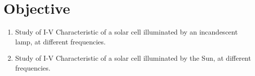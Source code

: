 \section{Objective}

\begin{enumerate}
    \item Study of I-V Characteristic of a solar cell illuminated by an incandescent lamp, at different frequencies.
    \item Study of I-V Characteristic of a solar cell illuminated by the Sun, at different frequencies.
\end{enumerate}